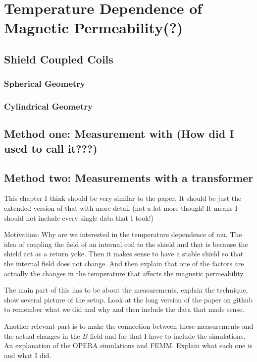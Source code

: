 \chapter{Temperature Dependence of Magnetic Permeability(?)}

\section{Shield Coupled Coils}
\subsection{Spherical Geometry}
\subsection{Cylindrical Geometry}


\section{Method one: Measurement with (How did I used to call it???) }

\section{Method two: Measurements with a transformer}




\begin{description}
\item{This chapter I think should be very similar to the paper. It
  should be just the extended version of that with more detail (not a
  lot more though! It means I should not include every single data
  that I took!)}
  \item{Motivation: Why are we interested in the temperature
    dependence of mu. The idea of coupling the field of an internal
    coil to the shield and that is because the shield act as a return
    yoke. Then it makes sense to have a stable shield so that the
    internal field does not change. And then explain that one of the
    factors are actually the changes in the temperature that affects
    the magnetic permeability.}
  \item{The main part of this has to be about the measurements,
    explain the technique, show several picture of the setup. Look at
    the long version of the paper on github to remember what we did
    and why and then include the data that made sense.}
  \item{Another relevant part is to make the connection between these
    measurements and the actual changes in the $B$ field and for that
    I have to include the simulations. An explanation of the OPERA
    simulations and FEMM. Explain what each one is and what I did.}
\end{description}


